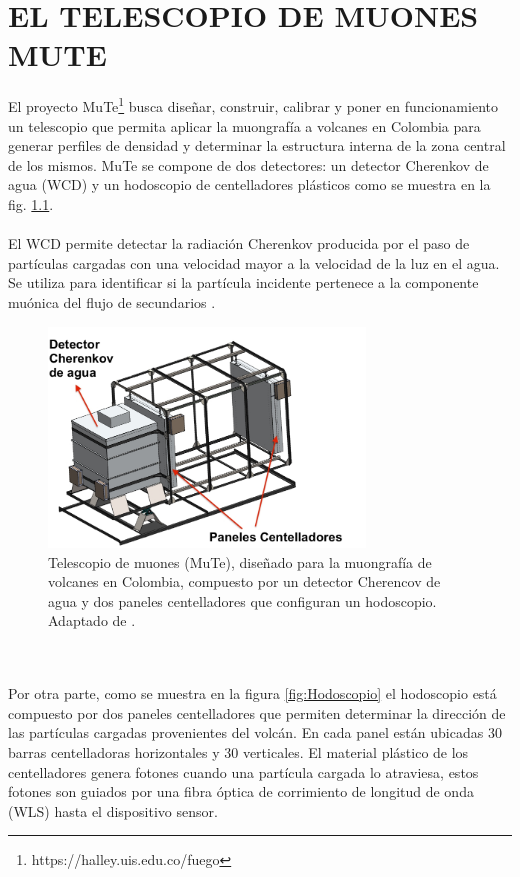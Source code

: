 \chapter{EL TELESCOPIO DE MUONES MUTE}
\label{Cap:MuTe}
El proyecto MuTe\footnote{https://halley.uis.edu.co/fuego} busca diseñar, construir, calibrar y poner en funcionamiento un telescopio que permita aplicar la muongrafía a volcanes en Colombia para generar perfiles de densidad y determinar la estructura interna de la zona central de los mismos. MuTe se compone de dos detectores: un detector Cherenkov de agua (WCD) y un hodoscopio de centelladores plásticos como se muestra en la fig. \ref{fig:MuTe}.\\ \\
El WCD permite detectar la radiación Cherenkov producida por el paso de partículas cargadas con una velocidad mayor a la velocidad de la luz en el agua. Se utiliza para identificar si la partícula incidente pertenece a la componente muónica del flujo de secundarios \citep{Tesis_adriana}.
\begin{figure}[h!]
\begin{centering}
  \includegraphics[width=0.75\textwidth]{Images/Mute.JPG}
  \caption{Telescopio de muones (MuTe), diseñado para la muongrafía de volcanes en Colombia, compuesto por un detector Cherencov de agua y dos paneles centelladores que configuran un hodoscopio. Adaptado de \citep{MuTe_mec}.}
  \label{fig:MuTe}
  \par\end{centering}
\end{figure}
\\ \\
Por otra parte, como se muestra en la figura \ref{fig:Hodoscopio} el hodoscopio está compuesto por dos paneles centelladores que permiten determinar la dirección de las partículas cargadas provenientes del volcán. En cada panel están ubicadas 30 barras centelladoras horizontales y 30 verticales. El material plástico de los centelladores genera fotones  cuando una partícula cargada lo atraviesa, estos fotones son guiados por una fibra óptica de corrimiento de longitud de onda (WLS) hasta el dispositivo sensor.    
